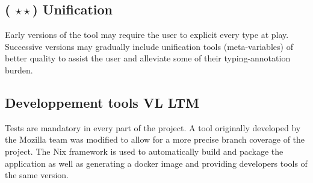 \documentclass[twocolumn]{article}
\newcommand{\members}[1]{\texorpdfstring{\hfill\scriptsize #1}{}}
\newcommand{\etde}{({\color{Orange} $\star\star$}) }
\begin{document}
\subsection{\etde Unification}
Early versions of the tool may require the user
to explicit every type at play. Successive versions may gradually include
unification tools (meta-variables) of better quality to assist the user and
alleviate some of their typing-annotation burden.

\subsection{Developpement tools \members{VL LTM}}
Tests are mandatory in every
part of the project. A tool originally developed by the Mozilla team was
modified to allow for a more precise branch coverage of the project. The Nix
framework is used to automatically build and package the application as well as
generating a docker image and providing developers tools of the same version.

\end{document}
